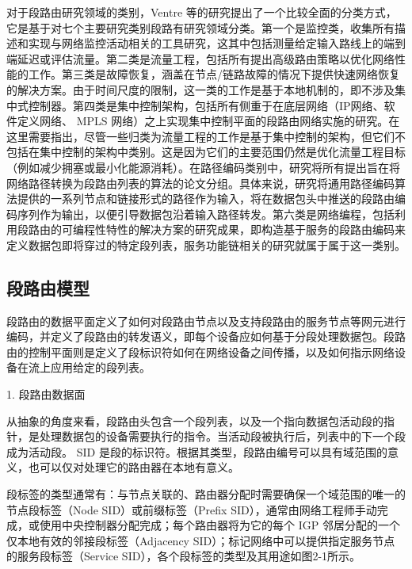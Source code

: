 对于段路由研究领域的类别，Ventre \cite{SRSURVEYS} 等的研究提出了一个比较全面的分类方式，它是基于对七个主要研究类别段路有研究领域分类。第一个是监控类，收集所有描述和实现与网络监控活动相关的工具研究，这其中包括测量给定输入路线上的端到端延迟或评估流量。第二类是流量工程，包括所有提出高级路由策略以优化网络性能的工作。第三类是故障恢复，涵盖在节点/链路故障的情况下提供快速网络恢复的解决方案。由于时间尺度的限制，这一类的工作是基于本地机制的，即不涉及集中式控制器。第四类是集中控制架构，包括所有侧重于在底层网络（IP网络、软件定义网络、 \gls*{MPLS} 网络）之上实现集中控制平面的段路由网络实施的研究。在这里需要指出，尽管一些归类为流量工程的工作是基于集中控制的架构，但它们不包括在集中控制的架构中类别。这是因为它们的主要范围仍然是优化流量工程目标（例如减少拥塞或最小化能源消耗）。在路径编码类别中，研究将所有提出旨在将网络路径转换为段路由列表的算法的论文分组。具体来说，研究将通用路径编码算法提供的一系列节点和链接形式的路径作为输入，将在数据包头中推送的段路由编码序列作为输出，以便引导数据包沿着输入路径转发。第六类是网络编程，包括利用段路由的可编程性特性的解决方案的研究成果，即构造基于服务的段路由编码来定义数据包即将穿过的特定段列表，服务功能链相关的研究就属于属于这一类别。

\subsection{段路由模型}

段路由的数据平面定义了如何对段路由节点以及支持段路由的服务节点等网元进行编码，并定义了段路由的转发语义，即每个设备应如何基于分段处理数据包。段路由的控制平面则是定义了段标识符如何在网络设备之间传播，以及如何指示网络设备在流上应用给定的段列表。

1. 段路由数据面

从抽象的角度来看，段路由头包含一个段列表，以及一个指向数据包活动段的指针，是处理数据包的设备需要执行的指令。当活动段被执行后，列表中的下一个段成为活动段。 \gls*{SID} 是段的标识符。根据其类型，段路由编号可以具有域范围的意义，也可以仅对处理它的路由器在本地有意义。

段标签的类型通常有：与节点关联的、路由器分配时需要确保一个域范围的唯一的节点段标签（Node SID）或前缀标签（Prefix SID），通常由网络工程师手动完成，或使用中央控制器分配完成；每个路由器将为它的每个 \gls*{IGP} 邻居分配的一个仅本地有效的邻接段标签（Adjacency SID）；标记网络中可以提供指定服务节点的服务段标签（Service SID），各个段标签的类型及其用途如图2-1所示。

